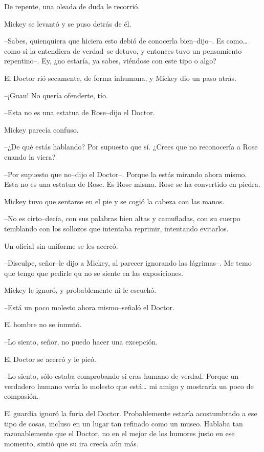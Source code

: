 De repente, una oleada de duda le recorrió.

Mickey se levantó y se puso detrás de él.

--Sabes, quienquiera que hiciera esto debió de conocerla bien--dijo--.
Es como\ldots{} como si la entendiera de verdad--se detuvo, y entonces
tuvo un pensamiento repentino--. Ey, ¿no estaría, ya sabes, viéndose con
este tipo o algo?

El Doctor rió secamente, de forma inhumana, y Mickey dio un paso atrás.

--¡Guau! No quería ofenderte, tío.

--Esta no es una estatua de Rose--dijo el Doctor.

Mickey parecía confuso.

--¿De qué estás hablando? Por supuesto que sí. ¿Crees que no reconocería
a Rose cuando la viera?

--Por supuesto que no--dijo el Doctor--. Porque la estás mirando ahora
mismo. Esta no es una estatua de Rose. Es Rose misma. Rose se ha
convertido en piedra.

Mickey tuvo que sentarse en el pie y se cogió la cabeza con las manos.

--No es cirto--decía, con sus palabras bien altas y camufladas, con su
cuerpo temblando con los sollozos que intentaba reprimir, intentando
evitarlos.

Un oficial sin uniforme se les acercó.

--Disculpe, señor--le dijo a Mickey, al parecer ignorando las
lágrimas--. Me temo que tengo que pedirle qu no se siente en las
exposiciones.

Mickey le ignoró, y probablemente ni le escuchó.

--Está un poco molesto ahora mismo--señaló el Doctor.

El hombre no se inmutó.

--Lo siento, señor, no puedo hacer una excepción.

El Doctor se acercó y le picó.

--Lo siento, sólo estaba comprobando si eras humano de verdad. Porque un
verdadero humano vería lo molesto que está\ldots{} mi amigo y mostraría
un poco de compasión.

El guardia ignoró la furia del Doctor. Probablemente estaría
acostumbrado a ese tipo de cosas, incluso en un lugar tan refinado como
un museo. Hablaba tan razonablemente que el Doctor, no en el mejor de
los humores justo en ese momento, sintió que su ira crecía aún más.

